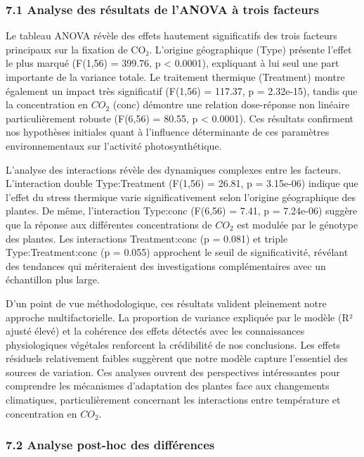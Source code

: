 \documentclass[
]{article}
\begin{document}
\subsubsection{7.1 Analyse des résultats de l'ANOVA à trois
facteurs}\label{analyse-des-ruxe9sultats-de-lanova-uxe0-trois-facteurs}

Le tableau ANOVA révèle des effets hautement significatifs des trois
facteurs principaux sur la fixation de CO₂. L'origine géographique
(Type) présente l'effet le plus marqué (F(1,56) = 399.76, p \textless{}
0.0001), expliquant à lui seul une part importante de la variance
totale. Le traitement thermique (Treatment) montre également un impact
très significatif (F(1,56) = 117.37, p = 2.32e-15), tandis que la
concentration en \(CO_2\) (conc) démontre une relation dose-réponse non
linéaire particulièrement robuste (F(6,56) = 80.55, p \textless{}
0.0001). Ces résultats confirment nos hypothèses initiales quant à
l'influence déterminante de ces paramètres environnementaux sur
l'activité photosynthétique.

L'analyse des interactions révèle des dynamiques complexes entre les
facteurs. L'interaction double Type:Treatment (F(1,56) = 26.81, p =
3.15e-06) indique que l'effet du stress thermique varie
significativement selon l'origine géographique des plantes. De même,
l'interaction Type:conc (F(6,56) = 7.41, p = 7.24e-06) suggère que la
réponse aux différentes concentrations de \(CO_2\) est modulée par le
génotype des plantes. Les interactions Treatment:conc (p = 0.081) et
triple Type:Treatment:conc (p = 0.055) approchent le seuil de
significativité, révélant des tendances qui mériteraient des
investigations complémentaires avec un échantillon plus large.

D'un point de vue méthodologique, ces résultats valident pleinement
notre approche multifactorielle. La proportion de variance expliquée par
le modèle (R² ajusté élevé) et la cohérence des effets détectés avec les
connaissances physiologiques végétales renforcent la crédibilité de nos
conclusions. Les effets résiduels relativement faibles suggèrent que
notre modèle capture l'essentiel des sources de variation. Ces analyses
ouvrent des perspectives intéressantes pour comprendre les mécanismes
d'adaptation des plantes face aux changements climatiques,
particulièrement concernant les interactions entre température et
concentration en \(CO_2\).

\subsubsection{7.2 Analyse post-hoc des
différences}\label{analyse-post-hoc-des-diffuxe9rences}
\end{document}
